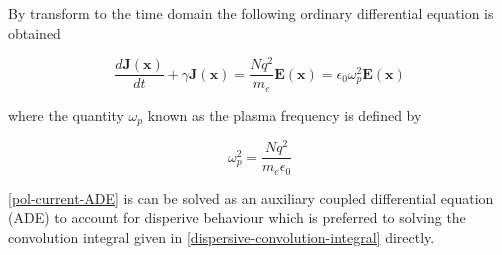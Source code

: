 By transform to the time domain the following ordinary differential equation is obtained

\begin{equation}
  \frac{d \mathbf{J}(\mathbf{x})}{dt} + \gamma \mathbf{J}(\mathbf{x}) = \frac{N q^2}{m_e} \mathbf{E}(\mathbf{x}) = \epsilon_0 \omega_p^2 \mathbf{E}(\mathbf{x})
  \label{pol-current-ADE}
\end{equation}

where the quantity $\omega_p$ known as the plasma frequency is defined by

\begin{equation}
  \omega_p ^2 = \frac{N q^2}{m_e \epsilon_0}
\end{equation}

\eqref{pol-current-ADE} is can be solved as an auxiliary coupled differential equation (ADE) to account for disperive behaviour \cite{taflove2005computational,niegemann2007higher,ji2007high} which is preferred to solving the convolution integral given in \eqref{dispersive-convolution-integral} directly.


% 
% 
% 
% 
% 
% 
% 
% 
 
